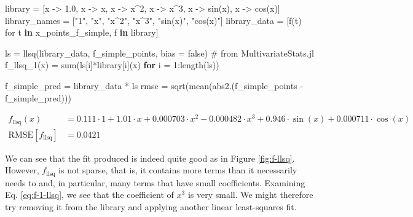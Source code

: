 \documentclass[
]{article}
\newenvironment{Shaded}{\begin{snugshade}}{\end{snugshade}}
\newcommand{\CommentTok}[1]{\textcolor[rgb]{0.37,0.37,0.37}{#1}}
\newcommand{\ConstantTok}[1]{\textcolor[rgb]{0.56,0.35,0.01}{#1}}
\newcommand{\ControlFlowTok}[1]{\textcolor[rgb]{0.00,0.23,0.31}{\textbf{#1}}}
\newcommand{\FloatTok}[1]{\textcolor[rgb]{0.68,0.00,0.00}{#1}}
\newcommand{\FunctionTok}[1]{\textcolor[rgb]{0.28,0.35,0.67}{#1}}
\newcommand{\KeywordTok}[1]{\textcolor[rgb]{0.00,0.23,0.31}{\textbf{#1}}}
\newcommand{\NormalTok}[1]{\textcolor[rgb]{0.00,0.23,0.31}{#1}}
\newcommand{\OperatorTok}[1]{\textcolor[rgb]{0.37,0.37,0.37}{#1}}
\newcommand{\StringTok}[1]{\textcolor[rgb]{0.13,0.47,0.30}{#1}}
\begin{document}
\begin{Shaded}
\begin{Highlighting}[]
\NormalTok{library }\OperatorTok{=}\NormalTok{ [x }\OperatorTok{{-}\textgreater{}} \FloatTok{1.0}\NormalTok{, x }\OperatorTok{{-}\textgreater{}}\NormalTok{ x, x }\OperatorTok{{-}\textgreater{}}\NormalTok{ x}\OperatorTok{\^{}}\FloatTok{2}\NormalTok{, x }\OperatorTok{{-}\textgreater{}}\NormalTok{ x}\OperatorTok{\^{}}\FloatTok{3}\NormalTok{, x }\OperatorTok{{-}\textgreater{}} \FunctionTok{sin}\NormalTok{(x), x }\OperatorTok{{-}\textgreater{}} \FunctionTok{cos}\NormalTok{(x)]}
\NormalTok{library\_names }\OperatorTok{=}\NormalTok{ [}\StringTok{"1"}\NormalTok{, }\StringTok{"x"}\NormalTok{, }\StringTok{"x\^{}2"}\NormalTok{, }\StringTok{"x\^{}3"}\NormalTok{, }\StringTok{"sin(x)"}\NormalTok{, }\StringTok{"cos(x)"}\NormalTok{]}
\NormalTok{library\_data }\OperatorTok{=}\NormalTok{ [}\FunctionTok{f}\NormalTok{(t) for t }\KeywordTok{in}\NormalTok{ x\_points\_f\_simple, f }\KeywordTok{in}\NormalTok{ library]}

\NormalTok{ls }\OperatorTok{=} \FunctionTok{llsq}\NormalTok{(library\_data, f\_simple\_points, bias }\OperatorTok{=} \ConstantTok{false}\NormalTok{) }\CommentTok{\# from MultivariateStats.jl}
\FunctionTok{f\_llsq\_1}\NormalTok{(x) }\OperatorTok{=} \FunctionTok{sum}\NormalTok{(ls[i]}\OperatorTok{*}\NormalTok{library[i](x) }\ControlFlowTok{for}\NormalTok{ i }\OperatorTok{=} \FloatTok{1}\OperatorTok{:}\FunctionTok{length}\NormalTok{(ls))}

\NormalTok{f\_simple\_pred }\OperatorTok{=}\NormalTok{ library\_data }\OperatorTok{*}\NormalTok{ ls}
\NormalTok{rmse }\OperatorTok{=} \FunctionTok{sqrt}\NormalTok{(}\FunctionTok{mean}\NormalTok{(}\FunctionTok{abs2}\NormalTok{.(f\_simple\_points }\OperatorTok{{-}}\NormalTok{ f\_simple\_pred)))}
\end{Highlighting}
\end{Shaded}

\begin{subequations} \label{eq:f-1-llsq} \begin{align}    f_{\text{llsq}}(x) &= 0.111 \cdot 1 + 1.01 \cdot x + 0.000703 \cdot x^{2} -0.000482 \cdot x^{3} + 0.946 \cdot \sin\left( x \right) + 0.000711 \cdot \cos\left( x \right) \\
  \text{RMSE}[f_{\text{llsq}}] &= 0.0421 \end{align} \end{subequations}

We can see that the fit produced is indeed quite good as in Figure
\ref{fig:f-llsq}. However, \(f_{\text{llsq}}\) is not sparse, that is,
it contains more terms than it necessarily needs to and, in particular,
many terms that have small coefficients. Examining Eq.
\eqref{eq:f-1-llsq}, we see that the coefficient of \(x^3\) is very
small. We might therefore try removing it from the library and applying
another linear least-squares fit.
\end{document}

